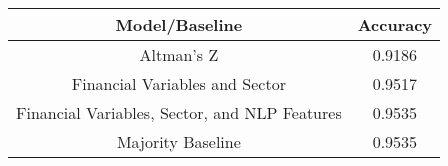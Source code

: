 \footnotesize
\begin{tabular}{cc}
\toprule
Model/Baseline & Accuracy \\
\midrule
Altman's Z & 0.9186 \\
Financial Variables and Sector & 0.9517 \\
Financial Variables, Sector, and NLP Features & 0.9535 \\
Majority Baseline & 0.9535 \\
\bottomrule
\end{tabular}

\normalsize